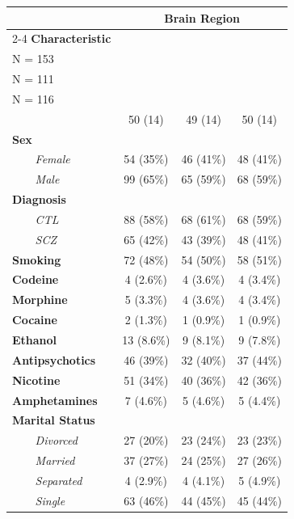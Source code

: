 \begin{table}[t]
\fontsize{12.0pt}{14.0pt}\selectfont
\begin{tabular*}{\linewidth}{@{\extracolsep{\fill}}lccc}
\toprule
 & \multicolumn{3}{c}{\textbf{Brain Region}} \\ 
\cmidrule(lr){2-4}
\textbf{Characteristic} & \shortstack[l]{\textbf{Caudate} \\N = 153}\textsuperscript{\textit{1}} & \shortstack[l]{\textbf{DLPFC} \\N = 111}\textsuperscript{\textit{1}} & \shortstack[l]{\textbf{Hippocampus} \\N = 116}\textsuperscript{\textit{1}} \\ 
\midrule\addlinespace[2.5pt]
{\bfseries Age} & 50 (14) & 49 (14) & 50 (14) \\ 
{\bfseries Sex} &  &  &  \\ 
{\itshape     Female} & 54 (35\%) & 46 (41\%) & 48 (41\%) \\ 
{\itshape     Male} & 99 (65\%) & 65 (59\%) & 68 (59\%) \\ 
{\bfseries Diagnosis} &  &  &  \\ 
{\itshape     CTL} & 88 (58\%) & 68 (61\%) & 68 (59\%) \\ 
{\itshape     SCZ} & 65 (42\%) & 43 (39\%) & 48 (41\%) \\ 
{\bfseries Smoking} & 72 (48\%) & 54 (50\%) & 58 (51\%) \\ 
{\bfseries Codeine} & 4 (2.6\%) & 4 (3.6\%) & 4 (3.4\%) \\ 
{\bfseries Morphine} & 5 (3.3\%) & 4 (3.6\%) & 4 (3.4\%) \\ 
{\bfseries Cocaine} & 2 (1.3\%) & 1 (0.9\%) & 1 (0.9\%) \\ 
{\bfseries Ethanol} & 13 (8.6\%) & 9 (8.1\%) & 9 (7.8\%) \\ 
{\bfseries Antipsychotics} & 46 (39\%) & 32 (40\%) & 37 (44\%) \\ 
{\bfseries Nicotine} & 51 (34\%) & 40 (36\%) & 42 (36\%) \\ 
{\bfseries Amphetamines} & 7 (4.6\%) & 5 (4.6\%) & 5 (4.4\%) \\ 
{\bfseries Marital Status} &  &  &  \\ 
{\itshape     Divorced} & 27 (20\%) & 23 (24\%) & 23 (23\%) \\ 
{\itshape     Married} & 37 (27\%) & 24 (25\%) & 27 (26\%) \\ 
{\itshape     Separated} & 4 (2.9\%) & 4 (4.1\%) & 5 (4.9\%) \\ 
{\itshape     Single} & 63 (46\%) & 44 (45\%) & 45 (44\%) \\ 

\end{tabular*}
\end{table}
